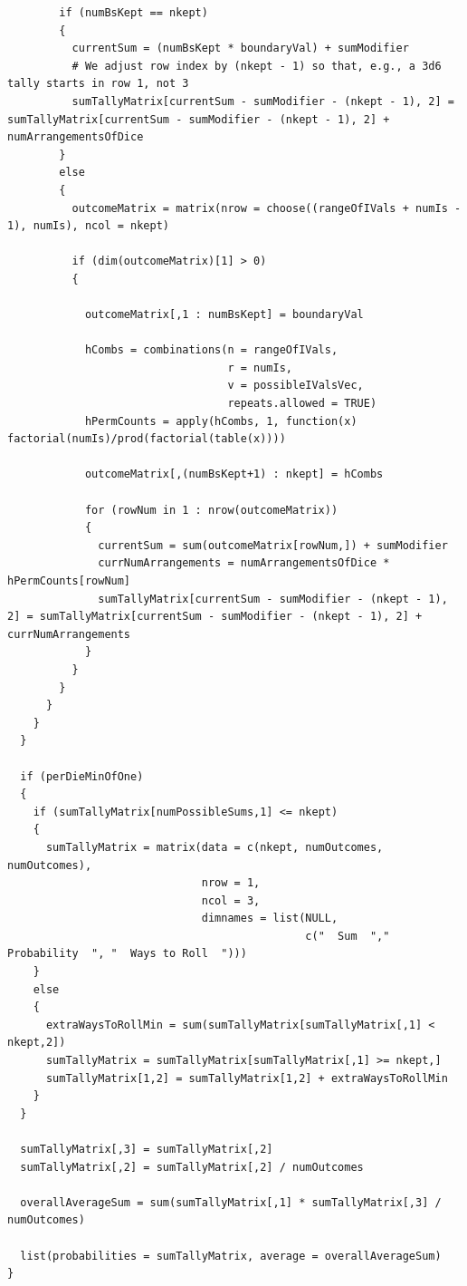 \documentclass[12pt]{article}
\begin{document}
\begin{lstlisting}
        if (numBsKept == nkept)
        {
          currentSum = (numBsKept * boundaryVal) + sumModifier
          # We adjust row index by (nkept - 1) so that, e.g., a 3d6 tally starts in row 1, not 3
          sumTallyMatrix[currentSum - sumModifier - (nkept - 1), 2] = sumTallyMatrix[currentSum - sumModifier - (nkept - 1), 2] + numArrangementsOfDice
        }
        else
        {
          outcomeMatrix = matrix(nrow = choose((rangeOfIVals + numIs - 1), numIs), ncol = nkept)
          
          if (dim(outcomeMatrix)[1] > 0)
          {
            
            outcomeMatrix[,1 : numBsKept] = boundaryVal
            
            hCombs = combinations(n = rangeOfIVals,
                                  r = numIs,
                                  v = possibleIValsVec,
                                  repeats.allowed = TRUE)
            hPermCounts = apply(hCombs, 1, function(x) factorial(numIs)/prod(factorial(table(x))))
            
            outcomeMatrix[,(numBsKept+1) : nkept] = hCombs
            
            for (rowNum in 1 : nrow(outcomeMatrix))
            {
              currentSum = sum(outcomeMatrix[rowNum,]) + sumModifier
              currNumArrangements = numArrangementsOfDice * hPermCounts[rowNum]
              sumTallyMatrix[currentSum - sumModifier - (nkept - 1), 2] = sumTallyMatrix[currentSum - sumModifier - (nkept - 1), 2] + currNumArrangements
            }
          }
        }
      }
    }
  }
  
  if (perDieMinOfOne)
  {
    if (sumTallyMatrix[numPossibleSums,1] <= nkept)
    {
      sumTallyMatrix = matrix(data = c(nkept, numOutcomes, numOutcomes),
                              nrow = 1,
                              ncol = 3,
                              dimnames = list(NULL,
                                              c("  Sum  ","  Probability  ", "  Ways to Roll  ")))
    }
    else
    {
      extraWaysToRollMin = sum(sumTallyMatrix[sumTallyMatrix[,1] < nkept,2])
      sumTallyMatrix = sumTallyMatrix[sumTallyMatrix[,1] >= nkept,]
      sumTallyMatrix[1,2] = sumTallyMatrix[1,2] + extraWaysToRollMin
    }
  }
  
  sumTallyMatrix[,3] = sumTallyMatrix[,2]
  sumTallyMatrix[,2] = sumTallyMatrix[,2] / numOutcomes
  
  overallAverageSum = sum(sumTallyMatrix[,1] * sumTallyMatrix[,3] / numOutcomes)
  
  list(probabilities = sumTallyMatrix, average = overallAverageSum)
}

\end{lstlisting}
\end{document}
